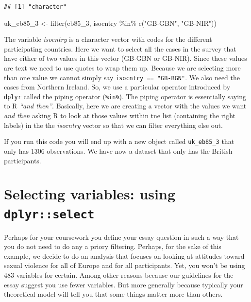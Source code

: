 \documentclass[
]{book}
\newenvironment{Shaded}{\begin{snugshade}}{\end{snugshade}}
\newcommand{\FunctionTok}[1]{\textcolor[rgb]{0.00,0.00,0.00}{#1}}
\newcommand{\NormalTok}[1]{#1}
\newcommand{\OtherTok}[1]{\textcolor[rgb]{0.56,0.35,0.01}{#1}}
\newcommand{\SpecialCharTok}[1]{\textcolor[rgb]{0.00,0.00,0.00}{#1}}
\newcommand{\StringTok}[1]{\textcolor[rgb]{0.31,0.60,0.02}{#1}}
\begin{document}
\begin{verbatim}
## [1] "character"
\end{verbatim}

\begin{Shaded}
\begin{Highlighting}[]
\NormalTok{uk\_eb85\_3 }\OtherTok{\textless{}{-}} \FunctionTok{filter}\NormalTok{(eb85\_3, isocntry }\SpecialCharTok{\%in\%} \FunctionTok{c}\NormalTok{(}\StringTok{"GB{-}GBN"}\NormalTok{, }\StringTok{"GB{-}NIR"}\NormalTok{))}
\end{Highlighting}
\end{Shaded}

The variable \emph{isocntry} is a character vector with codes for the different participating countries. Here we want to select all the cases in the survey that have either of two values in this vector (GB-GBN or GB-NIR). Since these values are text we need to use quotes to wrap them up. Because we are selecting more than one value we cannot simply say \texttt{isocntry\ ==\ "GB-BGN"}. We also need the cases from Northern Ireland. So, we use a particular operator introduced by \texttt{dplyr} called the piping operator (\texttt{\%in\%}). The piping operator is essentially saying to R \emph{``and then''}. Basically, here we are creating a vector with the values we want \emph{and then} asking R to look at those values within tne list (containing the right labels) in the the \emph{isocntry} vector so that we can filter everything else out.

If you run this code you will end up with a new object called \texttt{uk\_eb85\_3} that only has 1306 observations. We have now a dataset that only has the British participants.

\hypertarget{selecting-variables-using-dplyrselect}{%
\section{\texorpdfstring{Selecting variables: using \texttt{dplyr::select}}{Selecting variables: using dplyr::select}}\label{selecting-variables-using-dplyrselect}}

Perhaps for your coursework you define your essay question in such a way that you do not need to do any a priory filtering. Perhaps, for the sake of this example, we decide to do an analysis that focuses on looking at attitudes toward sexual violence for all of Europe and for all participants. Yet, you won't be using 483 variables for certain. Among other reasons because our guidelines for the essay suggest you use fewer variables. But more generally because typically your theoretical model will tell you that some things matter more than others.
\end{document}
